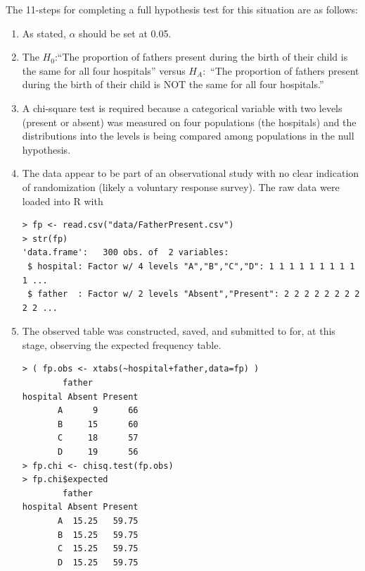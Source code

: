 \documentclass[10pt,openany]{book}\usepackage[]{graphicx}\usepackage[]{color}
\makeatletter
\newenvironment{kframe}{%
 \def\at@end@of@kframe{}%
 \ifinner\ifhmode%
  \def\at@end@of@kframe{\end{minipage}}%
  \begin{minipage}{\columnwidth}%
 \fi\fi%
 \def\FrameCommand##1{\hskip\@totalleftmargin \hskip-\fboxsep
 \colorbox{shadecolor}{##1}\hskip-\fboxsep
     \hskip-\linewidth \hskip-\@totalleftmargin \hskip\columnwidth}%
 \MakeFramed {\advance\hsize-\width
   \@totalleftmargin\z@ \linewidth\hsize
   \@setminipage}}%
 {\par\unskip\endMakeFramed%
 \at@end@of@kframe}
\newenvironment{knitrout}{}{} %
\makeatother
\begin{document}
The 11-steps  for completing a full hypothesis test for this situation are as follows:
  \begin{enumerate}
    \item As stated, $\alpha$ should be set at 0.05.
    \item The $H_{0}$:``The proportion of fathers present during the birth of their child is the same for all four hospitals'' versus $H_{A}:$ ``The proportion of fathers present during the birth of their child is NOT the same for all four hospitals.''
    \item A chi-square test is required because a categorical variable with two levels (present or absent) was measured on four populations (the hospitals) and the distributions into the levels is being compared among populations in the null hypothesis.
    \item The data appear to be part of an observational study with no clear indication of randomization (likely a voluntary response survey).  The raw data were loaded into R with
\begin{knitrout}
\color{fgcolor}\begin{kframe}
\begin{verbatim}
> fp <- read.csv("data/FatherPresent.csv")
> str(fp)
'data.frame':	300 obs. of  2 variables:
 $ hospital: Factor w/ 4 levels "A","B","C","D": 1 1 1 1 1 1 1 1 1 1 ...
 $ father  : Factor w/ 2 levels "Absent","Present": 2 2 2 2 2 2 2 2 2 2 ...
\end{verbatim}
\end{kframe}
\end{knitrout}
    \item The observed table was constructed, saved, and submitted to  for, at this stage, observing the expected frequency table.
\begin{knitrout}
\color{fgcolor}\begin{kframe}
\begin{verbatim}
> ( fp.obs <- xtabs(~hospital+father,data=fp) )
        father
hospital Absent Present
       A      9      66
       B     15      60
       C     18      57
       D     19      56
> fp.chi <- chisq.test(fp.obs)
> fp.chi$expected
        father
hospital Absent Present
       A  15.25   59.75
       B  15.25   59.75
       C  15.25   59.75
       D  15.25   59.75
\end{verbatim}
\end{kframe}

\end{knitrout}
\end{enumerate}
\end{document}
